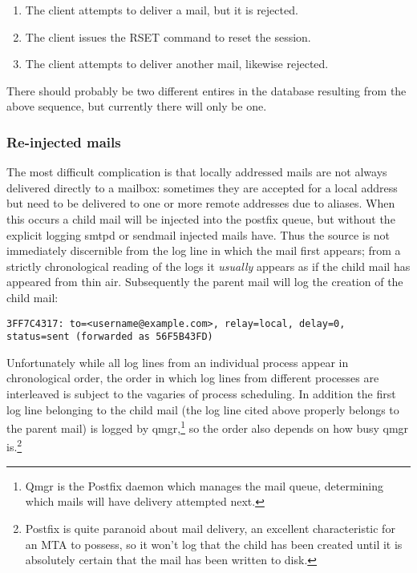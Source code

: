 \documentclass[a4paper,12pt,draft]{article}
\begin{document}
\begin{enumerate}

    \item The client attempts to deliver a mail, but it is rejected.

    \item The client issues the RSET command to reset the session.

    \item The client attempts to deliver another mail, likewise rejected.

\end{enumerate}

There should probably be two different entires in the database resulting
from the above sequence, but currently there will only be one.



\subsubsection{Re-injected mails}

The most difficult complication is that locally addressed mails are not
always delivered directly to a mailbox: sometimes they are accepted for a
local address but need to be delivered to one or more remote addresses due
to aliases.  When this occurs a child mail will be injected into the
postfix queue, but without the explicit logging smtpd or sendmail injected
mails have.  Thus the source is not immediately discernible from the log
line in which the mail first appears; from a strictly chronological reading
of the logs it \textit{usually\/} appears as if the child mail has appeared
from thin air.  Subsequently the parent mail will log the creation of the
child mail:

\texttt{3FF7C4317: to=<username@example.com>, relay=local, \newline 
delay=0, status=sent (forwarded as 56F5B43FD)}

Unfortunately while all log lines from an individual process appear in
chronological order, the order in which log lines from different processes
are interleaved is subject to the vagaries of process scheduling.  In
addition the first log line belonging to the child mail (the log line cited
above properly belongs to the parent mail) is logged by qmgr,\footnote{Qmgr
is the Postfix daemon which manages the mail queue, determining which mails
will have delivery attempted next.} so the order also depends on how busy
qmgr is.\footnote{Postfix is quite paranoid about mail delivery, an
excellent characteristic for an MTA to possess, so it won't log that the
child has been created until it is absolutely certain that the mail has
been written to disk.}
\end{document}
